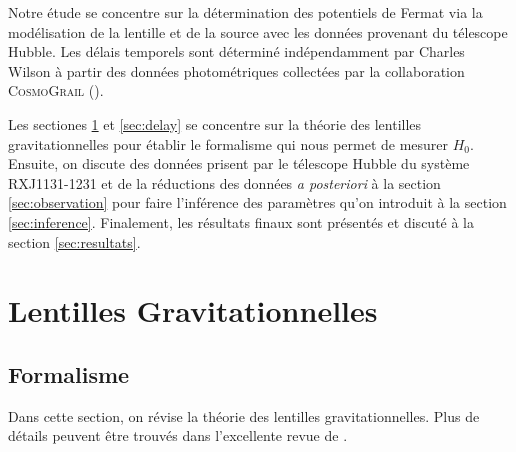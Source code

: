 \documentclass[times,10pt,twocolumn]{article}
\begin{document}
Notre étude se concentre sur la détermination des potentiels de Fermat 
via la modélisation de la lentille et de la source avec les données provenant du 
télescope Hubble. Les délais temporels sont déterminé indépendamment par 
Charles Wilson à partir 
des données photométriques collectées par la collaboration \textsc{CosmoGrail} 
(\citet{Tewes2013}).

Les sectiones \ref{sec:lens} et \ref{sec:delay} se concentre sur la 
théorie des lentilles gravitationnelles pour établir le formalisme 
qui nous permet de mesurer $H_0$. Ensuite, on discute des données 
prisent par le télescope Hubble du système RXJ1131-1231 et de la réductions 
des données \textit{a posteriori} à la section \ref{sec:observation} 
pour faire l'inférence des paramètres 
qu'on introduit à la section \ref{sec:inference}.
Finalement, les résultats finaux sont présentés et discuté à la section 
\ref{sec:resultats}.






\section{Lentilles Gravitationnelles}\label{sec:lens}
\subsection{Formalisme}
Dans cette section, on révise la théorie des lentilles gravitationnelles. 
Plus de détails peuvent être trouvés dans l'excellente revue de \citet{Treu2010}. \par
\end{document}
